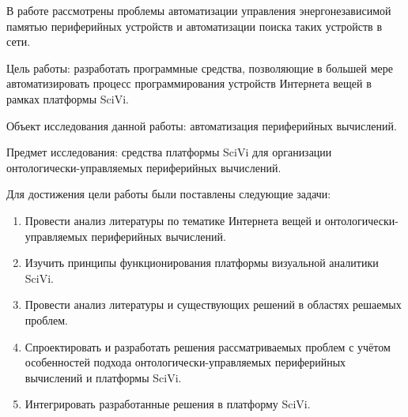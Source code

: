 В работе рассмотрены проблемы автоматизации управления энергонезависимой памятью периферийных устройств и автоматизации поиска таких устройств в сети.

Цель работы: разработать программные средства, позволяющие в большей мере автоматизировать процесс программирования устройств Интернета вещей в рамках платформы SciVi.

Объект исследования данной работы: автоматизация периферийных вычислений.

Предмет исследования: средства платформы SciVi для организации онтологически-управляемых периферийных вычислений.

Для достижения цели работы были поставлены следующие задачи:
\begin{enumerate}
	\item Провести анализ литературы по тематике Интернета вещей и онтологически-управляемых периферийных вычислений.
	\item Изучить принципы функционирования платформы визуальной аналитики SciVi.
	\item Провести анализ литературы и существующих решений в областях решаемых проблем.
	\item Спроектировать и разработать решения рассматриваемых проблем с учётом особенностей подхода онтологически-управляемых периферийных вычислений и платформы SciVi.
	\item Интегрировать разработанные решения в платформу SciVi.
\end{enumerate}
